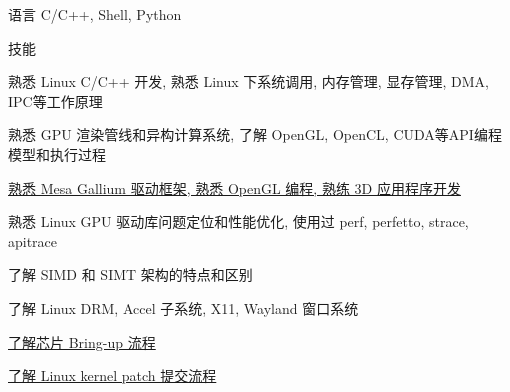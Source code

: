 
\begin{cvskills}
  \cvskill
    {语言} %
    {C/C++, Shell, Python} %
\end{cvskills}

\begin{cventries}
  \cventry
    {} %
    {技能} %
    {} %
    {} %
    {
      \begin{cvitems} %
        \item {熟悉 Linux C/C++ 开发, 熟悉 Linux 下系统调用, 内存管理, 显存管理, DMA, IPC等工作原理}
        \item {熟悉 GPU 渲染管线和异构计算系统, 了解 OpenGL, OpenCL, CUDA等API编程模型和执行过程}
        \item {\href{https://gitlab.freedesktop.org/mesa/mesa/-/merge\_requests?scope=all&state=all&author\_username=lucmann}{熟悉 Mesa Gallium 驱动框架, 熟悉 OpenGL 编程, 熟练 3D 应用程序开发}}
        \item {熟悉 Linux GPU 驱动库问题定位和性能优化, 使用过 perf, perfetto, strace, apitrace}
        \item {了解 SIMD 和 SIMT 架构的特点和区别}
        \item {了解 Linux DRM, Accel 子系统, X11, Wayland 窗口系统}
        \item {\href{https://gitlab.freedesktop.org/lucmann/hikey-970}{了解芯片 Bring-up 流程}}
        \item {\href{https://lucmann.github.io/lnx/patch-submit/}{了解 Linux kernel patch 提交流程}}
      \end{cvitems}
    }
\end{cventries}
